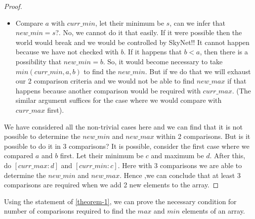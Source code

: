 \documentclass[14pt]{article}
\begin{document}
\begin{proof}
\begin{itemize}
				\item Compare $a$ with $curr\_min$, let their minimum be $s$, can we infer that $new\_min = s$?. No, we cannot do it that easily. If it were possible then the world would break and we would be controlled by SkyNet!! It cannot happen because we have not checked with $b$. If it happens that $b < a$, then there is a possibility that $new\_min = b$. So, it would become necessary to take $min(curr\_min, a, b)$ to find the $new\_min$. But if we do that we will exhaust our 2 comparison criteria and we would not be able to find $new\_max$ if that happens because another comparison would be required with $curr\_max$. (The similar argument suffices for the case where we would compare with $curr\_max$ first). 
			\end{itemize}
			We have considered all the non-trivial cases here and we can find that it is not possible to determine the $new\_min$ and $new\_max$ within 2 comparisons. But is it possible to do it in 3 comparisons? It is possible, consider the first case where we compared $a$ and $b$ first. Let their minimum be $c$ and maximum be $d$. After this, do $[curr\_max : d]$ and $[curr\_min : c]$. Here with 3 comparisons we are able to determine the $new\_min$ and $new\_max$. Hence ,we can conclude that at least 3 comparisons are required when we add 2 new elements to the array.
		\end{proof}
		Using the statement of \ref{theorem-1}, we can prove the necessary condition for number of comparisons required to find the $max$ and $min$ elements of an array.
		
\end{document}
